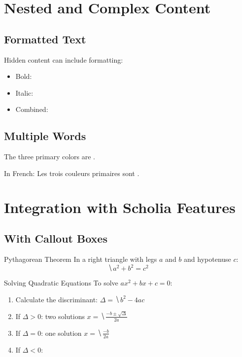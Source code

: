\documentclass[11pt,a4paper]{article}
\begin{document}
\section{Nested and Complex Content}

\subsection{Formatted Text}

Hidden content can include formatting:
\begin{itemize}
  \item Bold: 
  \item Italic: 
  \item Combined: 
\end{itemize}

\subsection{Multiple Words}

The three primary colors are .

In French: Les trois couleurs primaires sont .

\section{Integration with Scholia Features}

\subsection{With Callout Boxes}

\begin{definitionbox}{Pythagorean Theorem}
  In a right triangle with legs $a$ and $b$ and hypotenuse $c$:
  \[
    \hide{a^2 + b^2 = c^2}
  \]
\end{definitionbox}

\begin{methodbox}{Solving Quadratic Equations}
  To solve $ax^2 + bx + c = 0$:
  \begin{enumerate}
    \item Calculate the discriminant: $\Delta = \hide{b^2 - 4ac}$
    \item If $\Delta > 0$: two solutions $x = \hide{\frac{-b \pm \sqrt{\Delta}}{2a}}$
    \item If $\Delta = 0$: one solution $x = \hide{\frac{-b}{2a}}$
    \item If $\Delta < 0$: 
  \end{enumerate}
\end{methodbox}
\end{document}
